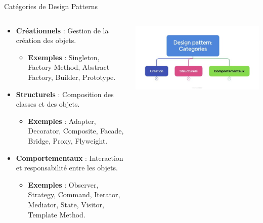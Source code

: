 \documentclass[aspectratio=169]{beamer}
\begin{document}
\begin{frame}{Catégories de Design Patterns}
    \begin{columns}
        \begin{column}{0.6\textwidth}
            \begin{itemize}
                \item \textbf{Créationnels} : Gestion de la création des objets.
                    \begin{itemize}
                        \item \textbf{Exemples} : Singleton, Factory Method, Abstract Factory, Builder, Prototype.
                    \end{itemize}
                \item \textbf{Structurels} : Composition des classes et des objets.
                    \begin{itemize}
                        \item \textbf{Exemples} : Adapter, Decorator, Composite, Facade, Bridge, Proxy, Flyweight.
                    \end{itemize}
                \item \textbf{Comportementaux} : Interaction et responsabilité entre les objets.
                    \begin{itemize}
                        \item \textbf{Exemples} : Observer, Strategy, Command, Iterator, Mediator, State, Visitor, Template Method.
                    \end{itemize}
            \end{itemize}
        \end{column}
        \begin{column}{0.4\textwidth}
                \begin{center}
                    \includegraphics[width=1.0\textwidth]{pic/design_patterns_categories.jpg}
                \end{center}
            \end{column}
        \end{columns}
\end{frame}
\end{document}
